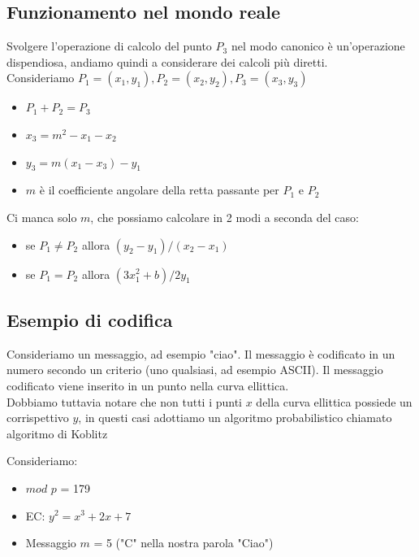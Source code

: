 \documentclass[11pt, oneside]{article}   	%
\begin{document}
\subsection*{Funzionamento nel mondo reale}
Svolgere l'operazione di calcolo del punto $P_3$ nel modo canonico è un'operazione dispendiosa, andiamo quindi a considerare dei calcoli più diretti.\\
Consideriamo $P_1 = (x_1, y_1), P_2 = (x_2, y_2), P_3 = (x_3, y_3)$
\begin{itemize}
\item $P_1 + P_2 = P_3$
\item $x_3 = m^2 - x_1 - x_2$ 
\item $y_3 = m(x_1 - x_3) - y_1$
\item $m$ è il coefficiente angolare della retta passante per $P_1$ e $P_2$
\end{itemize}
Ci manca solo $m$, che possiamo calcolare in 2 modi a seconda del caso:
\begin{itemize}
\item se $P_1  \neq P_2$ allora $(y_2 - y_1)/(x_2 -x_1)$
\item se $P_1 = P_2$ allora $(3x_1^2 + b) / 2y_1$
\end{itemize}

\subsection*{Esempio di codifica}
Consideriamo un messaggio, ad esempio "ciao". Il messaggio è codificato in un numero secondo un criterio (uno qualsiasi, ad esempio ASCII). Il messaggio codificato viene inserito in un punto nella curva ellittica. \\

Dobbiamo tuttavia notare che non tutti i punti $x$ della curva ellittica possiede un corrispettivo $y$, in questi casi adottiamo un algoritmo probabilistico chiamato algoritmo di Koblitz

Consideriamo:
\begin{itemize}
\item $mod$ $p$ = 179
\item EC: $y^2 = x^3 + 2x + 7$ 
\item Messaggio $m$ = 5 ("C" nella nostra parola "Ciao")
\end{itemize}
\end{document}
